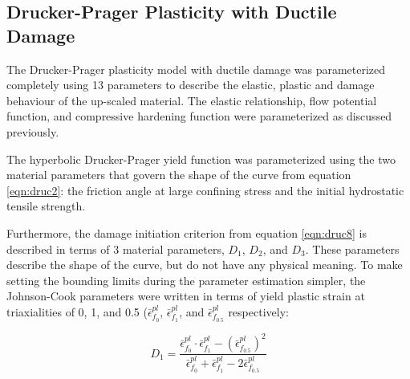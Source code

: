\subsection{Drucker-Prager Plasticity with Ductile Damage}
The Drucker-Prager plasticity model with ductile damage was parameterized completely using 13 parameters to describe the elastic, plastic and damage behaviour of the up-scaled material. The elastic relationship, flow potential function, and compressive hardening function were parameterized as discussed previously. 

The hyperbolic Drucker-Prager yield function was parameterized using the two material parameters that govern the shape of the curve from equation \ref{eqn:druc2}: the friction angle at large confining stress and the initial hydrostatic tensile strength.




Furthermore, the damage initiation criterion from equation \ref{eqn:druc8} is described in terms of 3 material parameters, $D_1$, $D_2$, and $D_3$. These parameters describe the shape of the curve, but do not have any physical meaning. To make setting the bounding limits during the parameter estimation simpler, the Johnson-Cook parameters were written in terms of yield plastic strain at triaxialities of 0, 1, and 0.5 ($\bar{\epsilon}^{pl}_{f_0}$, $\bar{\epsilon}^{pl}_{f_1}$, and $\bar{\epsilon}^{pl}_{f_{0.5}}$ respectively:

\begin{equation}
D_1=\frac{\bar{\epsilon}^{pl}_{f_0}\cdot \bar{\epsilon}^{pl}_{f_1}-\left ( \bar{\epsilon}^{pl}_{f_{0.5}} \right )^2}{\bar{\epsilon}^{pl}_{f_0}+ \bar{\epsilon}^{pl}_{f_1}-2\bar{\epsilon}^{pl}_{f_{0.5}}}
\label{eqn:dparam7}
\end{equation}

